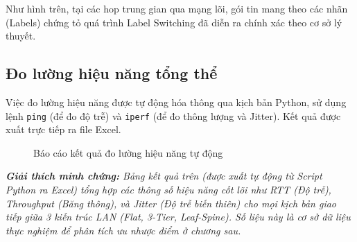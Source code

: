 Như hình trên, tại các hop trung gian qua mạng lõi, gói tin mang theo các nhãn (Labels) chứng tỏ quá trình Label Switching đã diễn ra chính xác theo cơ sở lý thuyết.

\subsection{Đo lường hiệu năng tổng thể}
Việc đo lường hiệu năng được tự động hóa thông qua kịch bản Python, sử dụng lệnh \texttt{ping} (để đo độ trễ) và \texttt{iperf} (để đo thông lượng và Jitter). Kết quả được xuất trực tiếp ra file Excel.

\begin{figure}[H]
    \centering
    \caption{Báo cáo kết quả đo lường hiệu năng tự động}
    \label{fig:performance_table}
\end{figure}
\textit{\textbf{Giải thích minh chứng:} Bảng kết quả trên (được xuất tự động từ Script Python ra Excel) tổng hợp các thông số hiệu năng cốt lõi như RTT (Độ trễ), Throughput (Băng thông), và Jitter (Độ trễ biến thiên) cho mọi kịch bản giao tiếp giữa 3 kiến trúc LAN (Flat, 3-Tier, Leaf-Spine). Số liệu này là cơ sở dữ liệu thực nghiệm để phân tích ưu nhược điểm ở chương sau.}
